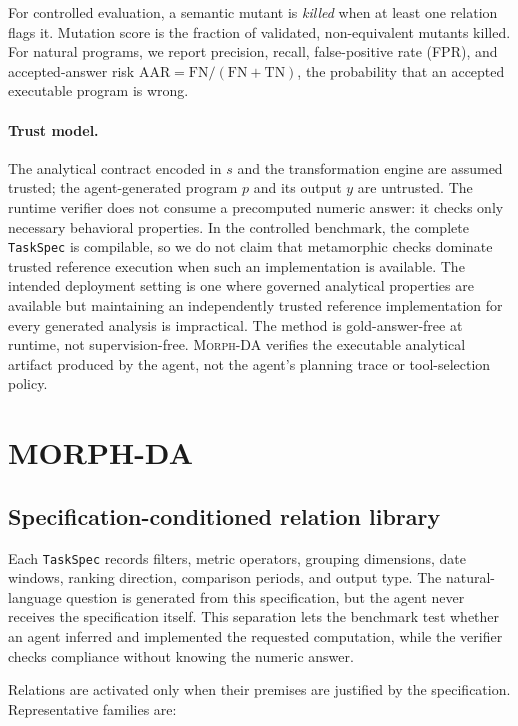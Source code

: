 \documentclass{article}
\newcommand{\morph}{\textsc{Morph-DA}\xspace}
\newcommand{\taskSpec}{\texttt{TaskSpec}\xspace}
\begin{document}
For controlled evaluation, a semantic mutant is \emph{killed} when at least one relation flags it. Mutation score is the fraction of validated, non-equivalent mutants killed. For natural programs, we report precision, recall, false-positive rate (FPR), and accepted-answer risk $\mathrm{AAR}=\mathrm{FN}/(\mathrm{FN}+\mathrm{TN})$, the probability that an accepted executable program is wrong.

\paragraph{Trust model.}
The analytical contract encoded in $s$ and the transformation engine are assumed trusted; the agent-generated program $p$ and its output $y$ are untrusted. The runtime verifier does not consume a precomputed numeric answer: it checks only necessary behavioral properties. In the controlled benchmark, the complete \taskSpec is compilable, so we do not claim that metamorphic checks dominate trusted reference execution when such an implementation is available. The intended deployment setting is one where governed analytical properties are available but maintaining an independently trusted reference implementation for every generated analysis is impractical. The method is gold-answer-free at runtime, not supervision-free. \morph verifies the executable analytical artifact produced by the agent, not the agent's planning trace or tool-selection policy.

\section{MORPH-DA}
\label{sec:method}

\subsection{Specification-conditioned relation library}

Each \taskSpec records filters, metric operators, grouping dimensions, date windows, ranking direction, comparison periods, and output type. The natural-language question is generated from this specification, but the agent never receives the specification itself. This separation lets the benchmark test whether an agent inferred and implemented the requested computation, while the verifier checks compliance without knowing the numeric answer.

Relations are activated only when their premises are justified by the specification. Representative families are:
\end{document}
